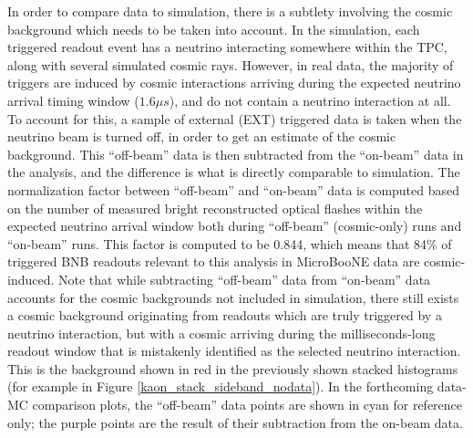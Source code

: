 In order to compare data to simulation, there is a subtlety involving the cosmic background which needs to be taken into account. In the simulation, each triggered readout event has a neutrino interacting somewhere within the TPC, along with several simulated cosmic rays. However, in real data, the majority of triggers are induced by cosmic interactions arriving during the expected neutrino arrival timing window ($1.6\mu s$), and do not contain a neutrino interaction at all. To account for this, a sample of external (EXT) triggered data is taken when the neutrino beam is turned off, in order to get an estimate of the cosmic background. This ``off-beam'' data is then subtracted from the ``on-beam'' data in the analysis, and the difference is what is directly comparable to simulation. The normalization factor between ``off-beam'' and ``on-beam'' data is computed based on the number of measured bright reconstructed optical flashes within the expected neutrino arrival window both during ``off-beam'' (cosmic-only) runs and ``on-beam'' runs. This factor is computed to be 0.844, which means that 84\% of triggered BNB readouts relevant to this analysis in MicroBooNE data are cosmic-induced. Note that while subtracting ``off-beam'' data from ``on-beam'' data accounts for the cosmic backgrounds not included in simulation, there still exists a cosmic background originating from readouts which are truly triggered by a neutrino interaction, but with a cosmic arriving during the milliseconds-long readout window that is mistakenly identified as the selected neutrino interaction. This is the background shown in red in the previously shown stacked histograms (for example in Figure \ref{kaon_stack_sideband_nodata}). In the forthcoming data-MC comparison plots, the ``off-beam'' data points are shown in cyan for reference only; the purple points are the result of their subtraction from the on-beam data.\\

